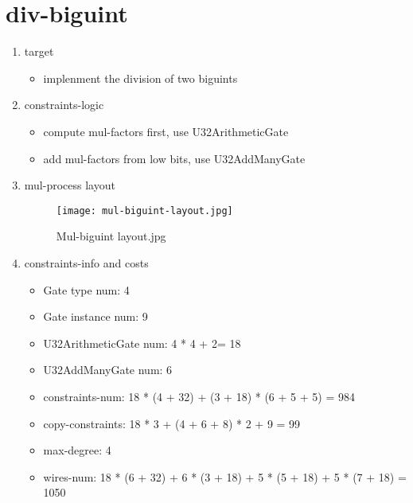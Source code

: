 \section{div-biguint}
\label{div-biguint}

\begin{enumerate}
    \item target
        \begin{itemize}
            \item implenment the division of two biguints
        \end{itemize}
    \item constraints-logic
        \begin{itemize}
            \item compute mul-factors first, use U32ArithmeticGate
            \item add mul-factors from low bits, use U32AddManyGate
        \end{itemize}
    \item mul-process layout
        \begin{figure}[!ht]
            \centering
            \texttt{[image: mul-biguint-layout.jpg]}
            \caption{Mul-biguint layout.jpg}
            \label{fig:mul-biguint-layout.jpg}
        \end{figure}
    
    \item constraints-info and costs
        \begin{itemize}
            \item Gate type num: 4
            \item Gate instance num: 9
            \item U32ArithmeticGate num: 4 * 4 + 2= 18
            \item U32AddManyGate num: 6
            \item constraints-num: 18 * (4 + 32) + (3 + 18) * (6 + 5 + 5) = 984
            \item copy-constraints: 18 * 3 + (4 + 6 + 8) * 2 + 9 = 99
            \item max-degree: 4
            \item wires-num: 18 * (6 + 32) + 6 * (3 + 18) + 5 * (5 + 18) + 5 * (7 + 18) = 1050
        \end{itemize}

\end{enumerate}